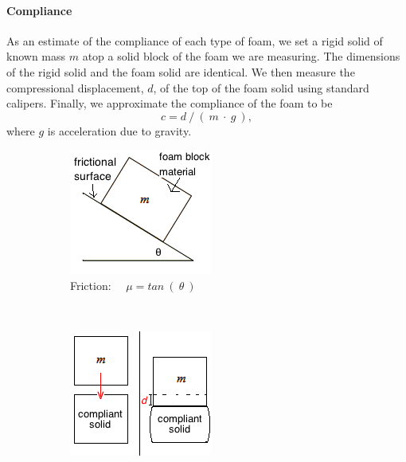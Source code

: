 \paragraph{Compliance}
As an estimate of the compliance of each type of foam, we set a rigid solid of known mass $m$ atop a solid block of the foam we are measuring.
The dimensions of the rigid solid and the foam solid are identical.
We then measure the compressional displacement, $d$, of the top of the foam solid using standard calipers.
Finally, we approximate the compliance of the foam to be 
$$
c = d~/~(~m~\cdot~g~),
$$ 
where $g$ is acceleration due to gravity.

\begin{figure}[]
    \begin{subfigure}[]{0.438\linewidth}
        \includegraphics[width=\linewidth]{images/friction}
        \caption{Friction: ~~$\mu = tan~(~\theta~)$}
        \label{fig:friction}
    \end{subfigure}
    ~~~~
    \begin{subfigure}[]{0.490\linewidth}
        \includegraphics[width=\linewidth]{images/compliance}

\end{subfigure}
\end{figure}
